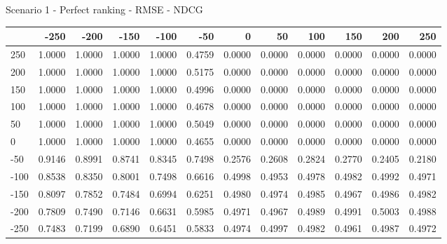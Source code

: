 Scenario 1 - Perfect ranking - RMSE - NDCG
\begin{tabular}{lrrrrrrrrrrr}
\toprule
{} &   -250 &   -200 &   -150 &   -100 &   -50  &    0   &    50  &    100 &    150 &    200 &    250 \\
\midrule
 250 & 1.0000 & 1.0000 & 1.0000 & 1.0000 & 0.4759 & 0.0000 & 0.0000 & 0.0000 & 0.0000 & 0.0000 & 0.0000 \\
 200 & 1.0000 & 1.0000 & 1.0000 & 1.0000 & 0.5175 & 0.0000 & 0.0000 & 0.0000 & 0.0000 & 0.0000 & 0.0000 \\
 150 & 1.0000 & 1.0000 & 1.0000 & 1.0000 & 0.4996 & 0.0000 & 0.0000 & 0.0000 & 0.0000 & 0.0000 & 0.0000 \\
 100 & 1.0000 & 1.0000 & 1.0000 & 1.0000 & 0.4678 & 0.0000 & 0.0000 & 0.0000 & 0.0000 & 0.0000 & 0.0000 \\
 50  & 1.0000 & 1.0000 & 1.0000 & 1.0000 & 0.5049 & 0.0000 & 0.0000 & 0.0000 & 0.0000 & 0.0000 & 0.0000 \\
 0   & 1.0000 & 1.0000 & 1.0000 & 1.0000 & 0.4655 & 0.0000 & 0.0000 & 0.0000 & 0.0000 & 0.0000 & 0.0000 \\
-50  & 0.9146 & 0.8991 & 0.8741 & 0.8345 & 0.7498 & 0.2576 & 0.2608 & 0.2824 & 0.2770 & 0.2405 & 0.2180 \\
-100 & 0.8538 & 0.8350 & 0.8001 & 0.7498 & 0.6616 & 0.4998 & 0.4953 & 0.4978 & 0.4982 & 0.4992 & 0.4971 \\
-150 & 0.8097 & 0.7852 & 0.7484 & 0.6994 & 0.6251 & 0.4980 & 0.4974 & 0.4985 & 0.4967 & 0.4986 & 0.4982 \\
-200 & 0.7809 & 0.7490 & 0.7146 & 0.6631 & 0.5985 & 0.4971 & 0.4967 & 0.4989 & 0.4991 & 0.5003 & 0.4988 \\
-250 & 0.7483 & 0.7199 & 0.6890 & 0.6451 & 0.5833 & 0.4974 & 0.4997 & 0.4982 & 0.4961 & 0.4987 & 0.4972 \\
\bottomrule
\end{tabular}


